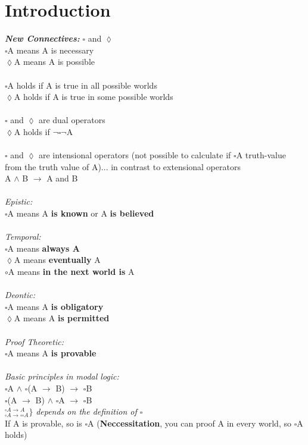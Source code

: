 \documentclass{report}
\begin{document}
 \section{Introduction}
 	\textbf{\textit{New Connectives:}} $\square$ and $\lozenge$ \\
 	$\square$A means A is necessary \\
 	$\lozenge$A means A is possible \\
 	\\
 	$\square$A holds if A is true in all possible worlds \\
 	$\lozenge$A holds if A is true in some possible worlds \\
 	\\
 	$\square$ and $\lozenge$ are dual operators \\
 	$\lozenge$A holds if $\neg\square\neg$A \\
 	\\
 	$\square$ and $\lozenge$ are intensional operators (not possible to calculate if $\square$A truth-value from the truth value of A)... in contrast to extensional operators \\
 	A $\wedge$ B $\rightarrow$ A and B \\
 	\\
 	\textit{Epistic:} \\
 	$\square$A means A \textbf{is known} or A \textbf{is believed} \\
 	\\
 	\textit{Temporal:} \\
 	$\square$A means \textbf{always A} \\
 	$\lozenge$A means \textbf{eventually} A \\
 	$\circ$A means \textbf{in the next world is} A \\
 	\\
 	\textit{Deontic:} \\
 	$\square$A means A \textbf{is obligatory} \\
 	$\lozenge$A means A \textbf{is permitted} \\
 	\\
 	\textit{Proof Theoretic:} \\
 	$\square$A means A \textbf{is provable} \\
 	\\
 	\textit{Basic principles in modal logic:} \\
 	$\square$A $\wedge$ $\square$(A $\rightarrow$ B) $\rightarrow$ $\square$B \\
 	$\square$(A $\rightarrow$ B) $\wedge$ $\square$A $\rightarrow$ $\square$B \\
 	$^{\square A \rightarrow A}_{\square A \rightarrow \square\square A} \rbrace$ \textit{depends on the definition of $\square$} \\
 	If A is provable, so is $\square$A (\textbf{Neccessitation}, you can proof A in every world, so $\square$A holds)
 	
\end{document}
